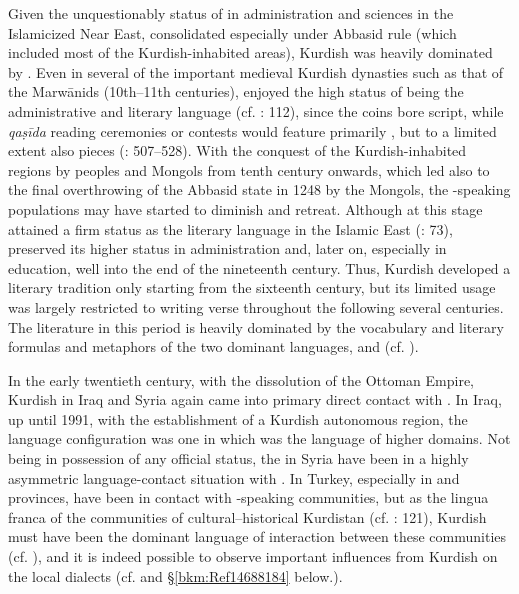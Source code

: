 \documentclass[output=paper]{langsci/langscibook}
\begin{document}
Given the unquestionably  status of  in administration and sciences in the Islamicized Near East, consolidated especially under Abbasid rule (which included most of the Kurdish-inhabited areas), Kurdish was heavily dominated by . Even in several of the important medieval Kurdish dynasties such as that of the Marwānids (10th–11th centuries),  enjoyed the high status of being the administrative and literary language (cf. \citealt{James2007}: 112), since the coins bore  script, while \textit{qaṣīda} reading ceremonies or contests would feature primarily , but to a limited extent also  pieces (\citealt{Ripper2012}: 507–528). With the conquest of the Kurdish-inhabited regions by  peoples and Mongols from tenth century onwards, which led also to the final overthrowing of the Abbasid state in 1248 by the Mongols, the -speaking populations may have started to diminish and retreat. Although at this stage  attained a firm status as the literary language in the Islamic East (\citealt{Perry2012}: 73),  preserved its higher status in administration and, later on, especially in education, well into the end of the nineteenth century. Thus, Kurdish developed a literary tradition only starting from the sixteenth century, but its limited usage was largely restricted to writing verse throughout the following several centuries. The literature in this period is heavily dominated by the vocabulary and literary formulas and metaphors of the two dominant languages,  and  (cf. \citealt{Öpenginforthcoming}). 

In the early twentieth century, with the dissolution of the Ottoman Empire, Kurdish in Iraq and Syria again came into primary direct contact with . In Iraq, up until 1991, with the establishment of a Kurdish autonomous region, the language configuration was one in which  was the  language of higher domains. Not being in possession of any official status, the  in Syria have been in a highly asymmetric language-contact situation with . In Turkey, especially in  and  provinces,  have been in contact with -speaking communities, but as the lingua franca of the communities of cultural–historical Kurdistan (cf. \citealt{Edwards1851}: 121), Kurdish must have been the dominant language of interaction between these communities (cf. \citealt{Lentin2012}), and it is indeed possible to observe important influences from Kurdish on the local  dialects (cf. \citealt{Jastrow2011Kurdish} and §\ref{bkm:Ref14688184} below.). 
\end{document}
